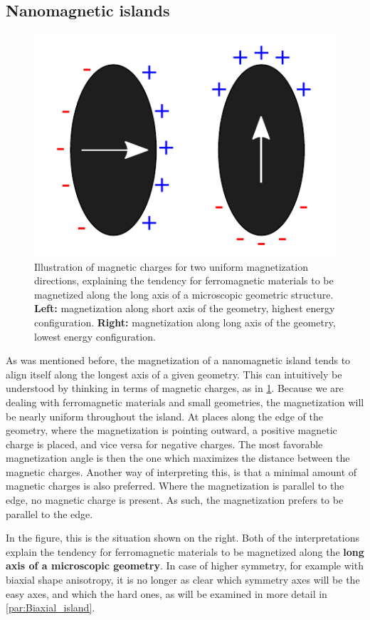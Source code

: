 \documentclass[11pt,a4paper,english,twoside]{article}
\begin{document}
\subsection{Nanomagnetic islands}
\label{par:Intro_nanomagnetic-islands}
\begin{figure}[b!]
    \centering
    \includegraphics[width=0.5\columnwidth]{Figures/Introduction/Longaxis.pdf}
    \caption{Illustration of magnetic charges for two uniform magnetization directions, explaining the tendency for ferromagnetic materials to be magnetized along the long axis of a microscopic geometric structure. \textbf{Left:} magnetization along short axis of the geometry, highest energy configuration. \textbf{Right:} magnetization along long axis of the geometry, lowest energy configuration.}
    \label{fig:Intro_IslandEllipticPreferredDirection}
\end{figure}
As was mentioned before, the magnetization of a nanomagnetic island tends to align itself along the longest axis of a given geometry. This can intuitively be understood by thinking in terms of magnetic charges, as in \cref{fig:Intro_IslandEllipticPreferredDirection}. Because we are dealing with ferromagnetic materials and small geometries, the magnetization will be nearly uniform throughout the island. At places along the edge of the geometry, where the magnetization is pointing outward, a positive magnetic charge is placed, and vice versa for negative charges. The most favorable magnetization angle is then the one which maximizes the distance between the magnetic charges. Another way of interpreting this, is that a minimal amount of magnetic charges is also preferred. Where the magnetization is parallel to the edge, no magnetic charge is present. As such, the magnetization prefers to be parallel to the edge. \par
In the figure, this is the situation shown on the right. Both of the interpretations explain the tendency for ferromagnetic materials to be magnetized along the \textbf{long axis of a microscopic geometry}. In case of higher symmetry, for example with biaxial shape anisotropy, it is no longer as clear which symmetry axes will be the easy axes, and which the hard ones, as will be examined in more detail in \cref{par:Biaxial_island}. \par
\end{document}

